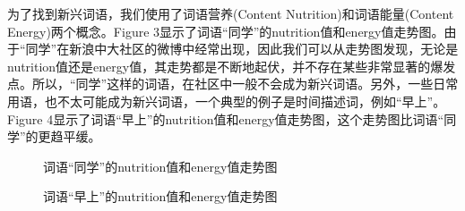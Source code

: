 \documentclass[a4paper]{article}
\begin{document}
\indent 为了找到新兴词语，我们使用了词语营养(Content Nutrition)和词语能量(Content Energy)两个概念。Figure 3显示了词语“同学”的nutrition值和energy值走势图。由于“同学”在新浪中大社区的微博中经常出现，因此我们可以从走势图发现，无论是nutrition值还是energy值，其走势都是不断地起伏，并不存在某些非常显著的爆发点。所以，“同学”这样的词语，在社区中一般不会成为新兴词语。另外，一些日常用语，也不太可能成为新兴词语，一个典型的例子是时间描述词，例如“早上”。Figure 4显示了词语“早上”的nutrition值和energy值走势图，这个走势图比词语“同学”的更趋平缓。
\begin{figure}[H]
\centering
{}
\caption{词语“同学”的nutrition值和energy值走势图}
\label{fig:3}
\end{figure}

\begin{figure}[H]
\centering
{}
\caption{词语“早上”的nutrition值和energy值走势图}
\label{fig:4}
\end{figure}
\end{document}
